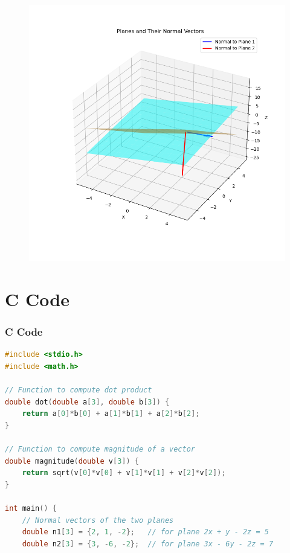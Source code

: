 \documentclass{beamer}
\begin{document}
       \begin{frame}[fragile]
    \begin{figure}[H]
    \centering
    \includegraphics[width = 0.6\columnwidth]{../figs/img.png}
    \caption*{}
    \label{figs}
\end{figure}
\end{frame}
\section{ C Code}
\begin{frame}[fragile]
\frametitle{C Code }
\begin{lstlisting}[language=C]
#include <stdio.h>
#include <math.h>

// Function to compute dot product
double dot(double a[3], double b[3]) {
    return a[0]*b[0] + a[1]*b[1] + a[2]*b[2];
}

// Function to compute magnitude of a vector
double magnitude(double v[3]) {
    return sqrt(v[0]*v[0] + v[1]*v[1] + v[2]*v[2]);
}

int main() {
    // Normal vectors of the two planes
    double n1[3] = {2, 1, -2};   // for plane 2x + y - 2z = 5
    double n2[3] = {3, -6, -2};  // for plane 3x - 6y - 2z = 7

 
\end{lstlisting}
\end{frame}
\end{document}
